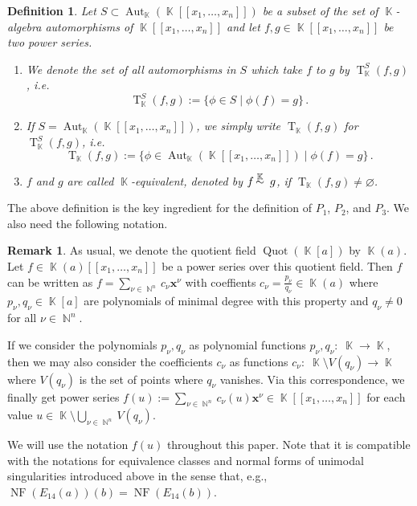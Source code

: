 \documentclass[noend]{amsproc}
\newtheorem{defn}[theorem]{Definition}
\theoremstyle{definition}
\newtheorem{remark}[theorem]{Remark}
\DeclareMathOperator{\N}{\mathbb{N}}
\DeclareMathOperator{\K}{\mathbb{K}}
\DeclareMathOperator{\NF}{NF}
\DeclareMathOperator{\T}{T}
\DeclareMathOperator{\Aut}{Aut}
\DeclareMathOperator{\Quot}{Quot}
\DeclareMathOperator{\ksim}{%
  \mathrel{%
    \raisebox{0pt}[\heightof{$\overset{\scriptscriptstyle\K}{\sim}$}]{%
      $\overset{\K}{\sim}$
    }
  }
}
\begin{document}
\begin{defn}
Let $S \subset \Aut_{\K}(\K[[x_1,\ldots,x_n]])$ be a subset of the set of
$\K$-algebra automorphisms of $\K[[x_1, \ldots, x_n]]$ and let
$f, g \in \K[[x_1, \ldots, x_n]]$ be two power series.
\begin{enumerate}
\item We denote the set of all automorphisms in $S$ which take $f$ to $g$ by
$\T_{\K}^S(f,g)$, i.e.\@
\[
\T_{\K}^S(f,g):=\{\phi\in S\mid \phi(f)=g\}\,.
\]

\item If $S=\Aut_{\K}(\K[[x_1,\ldots,x_n]])$, we simply write
$\T_{\K}(f,g)$ for $\T_{\K}^S(f,g)$, i.e.\@
\[
\T_{\K}(f,g)
:= \{\phi \in \Aut_{\K}(\K[[x_1, \ldots, x_n]]) \mid \phi(f) = g \} \,.
\]

\item $f$ and $g$ are called $\K$-equivalent, denoted by
$f \ksim g$, if $\T_{\K}(f,g) \neq \varnothing$.
\end{enumerate}
\end{defn}

The above definition is the key ingredient for the definition of $P_1$, $P_2$,
and $P_3$. We also need the following notation.

\begin{remark}
As usual, we denote the quotient field
$\Quot(\K[a])$ by $\K(a)$. Let $f \in \K(a)[[x_1,\ldots,x_n]]$ be a power
series over this quotient field. Then $f$ can be written as
$f = \sum_{\nu \in \N^n} c_\nu \boldsymbol{x}^\nu$ with coeffients
$c_\nu = \frac{p_\nu}{q_\nu} \in \K(a)$ where $p_\nu, q_\nu \in \K[a]$ are
polynomials of minimal degree with this property and $q_\nu \neq 0$ for all
$\nu \in \N^n$.

If we consider the polynomials $p_\nu, q_\nu$ as polynomial functions
$p_\nu, q_\nu: \; \K \rightarrow \K$, then we may also consider the
coefficients $c_\nu$ as functions
$c_\nu: \; \K \setminus V(q_\nu) \rightarrow \K$ where $V(q_\nu)$ is the set of
points where $q_\nu$ vanishes. Via this correspondence, we finally get power
series
$f(u) := \sum_{\nu \in \N^n} c_\nu(u) \boldsymbol{x}^\nu
\in \K[[x_1,\ldots,x_n]]$ for each value
$u \in \K \setminus \bigcup_{\nu \in \N^n} V(q_\nu)$.

We will use the notation $f(u)$ throughout this paper. Note that it is
compatible with the notations for equivalence classes and normal forms of
unimodal singularities introduced above in the sense that, e.g.,
$\NF(E_{14}(a))(b) = \NF(E_{14}(b))$.
\end{remark}
\end{document}
